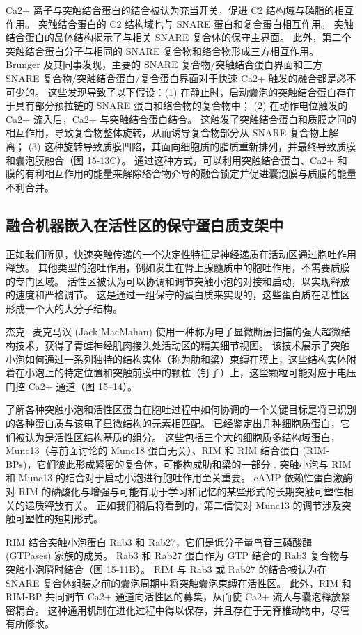 Ca2+ 离子与突触结合蛋白的结合被认为充当开关，促进 C2 结构域与磷脂的相互作用。 突触结合蛋白的 C2 结构域也与 SNARE 蛋白和复合蛋白相互作用。 突触结合蛋白的晶体结构揭示了与相关 SNARE 复合体的保守主界面。 此外，第二个突触结合蛋白分子与相同的 SNARE 复合物和络合物形成三方相互作用。 Brunger 及其同事发现，主要的 SNARE 复合物/突触结合蛋白界面和三方 SNARE 复合物/突触结合蛋白/复合蛋白界面对于快速 Ca2+ 触发的融合都是必不可少的。 这些发现导致了以下假设：(1) 在静止时，启动囊泡的突触结合蛋白存在于具有部分预拉链的 SNARE 蛋白和络合物的复合物中； (2) 在动作电位触发的 Ca2+ 流入后，Ca2+ 与突触结合蛋白结合。 这触发了突触结合蛋白和质膜之间的相互作用，导致复合物整体旋转，从而诱导复合物部分从 SNARE 复合物上解离； (3) 这种旋转导致质膜凹陷，其面向细胞质的脂质重新排列，并最终导致质膜和囊泡膜融合（图 15-13C）。 通过这种方式，可以利用突触结合蛋白、Ca2+ 和膜的有利相互作用的能量来解除络合物介导的融合锁定并促进囊泡膜与质膜的能量不利合并。

\subsection{融合机器嵌入在活性区的保守蛋白质支架中}

正如我们所见，快速突触传递的一个决定性特征是神经递质在活动区通过胞吐作用释放。 其他类型的胞吐作用，例如发生在肾上腺髓质中的胞吐作用，不需要质膜的专门区域。 活性区被认为可以协调和调节突触小泡的对接和启动，以实现释放的速度和严格调节。 这是通过一组保守的蛋白质来实现的，这些蛋白质在活性区形成一个大的大分子结构。

杰克·麦克马汉 (Jack MacMahan) 使用一种称为电子显微断层扫描的强大超微结构技术，获得了青蛙神经肌肉接头处活动区的精美细节视图。 该技术展示了突触小泡如何通过一系列独特的结构实体（称为肋和梁）束缚在膜上，这些结构实体附着在小泡上的特定位置和突触前膜中的颗粒（钉子）上，这些颗粒可能对应于电压门控 Ca2+ 通道（图 15–14）。

了解各种突触小泡和活性区蛋白在胞吐过程中如何协调的一个关键目标是将已识别的各种蛋白质与该电子显微结构的元素相匹配。 已经鉴定出几种细胞质蛋白，它们被认为是活性区结构基质的组分。 这些包括三个大的细胞质多结构域蛋白，Munc13（与前面讨论的 Munc18 蛋白无关）、RIM 和 RIM 结合蛋白 (RIM-BPs)，它们彼此形成紧密的复合体，可能构成肋和梁的一部分 . 突触小泡与 RIM 和 Munc13 的结合对于启动小泡进行胞吐作用至关重要。 cAMP 依赖性蛋白激酶对 RIM 的磷酸化与增强与可能有助于学习和记忆的某些形式的长期突触可塑性相关的递质释放有关。 正如我们稍后将看到的，第二信使对 Munc13 的调节涉及突触可塑性的短期形式。

RIM 结合突触小泡蛋白 Rab3 和 Rab27，它们是低分子量鸟苷三磷酸酶 (GTPases) 家族的成员。 Rab3 和 Rab27 蛋白作为 GTP 结合的 Rab3 复合物与突触小泡瞬时结合（图 15-11B）。 RIM 与 Rab3 或 Rab27 的结合被认为在 SNARE 复合体组装之前的囊泡周期中将突触囊泡束缚在活性区。 此外，RIM 和 RIM-BP 共同调节 Ca2+ 通道向活性区的募集，从而使 Ca2+ 流入与囊泡释放紧密耦合。 这种通用机制在进化过程中得以保存，并且存在于无脊椎动物中，尽管有所修改。


